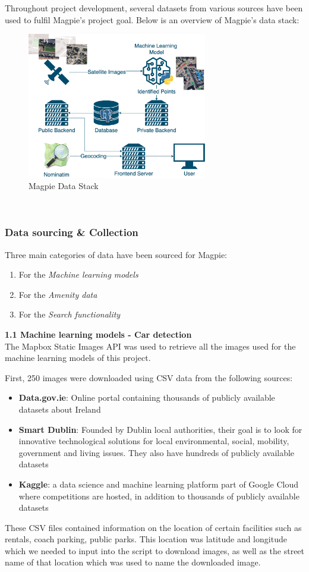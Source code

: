 Throughout project development, several datasets from various sources have been used to fulfil Magpie's project goal. Below is an overview of Magpie's data stack:
\begin{figure}[h!]
    \centering
    \includegraphics[width=0.7\textwidth]{images/magpie-data-stack.png}
    \caption{Magpie Data Stack}
\end{figure}\\

\subsubsection{Data sourcing \& Collection}
Three main categories of data have been sourced for Magpie:
\begin{enumerate}
    \item For the \emph{Machine learning models}
    \item For the \emph{Amenity data}
    \item For the \emph{Search functionality}
\end{enumerate}

\textbf{1.1 Machine learning models - Car detection}\\
The Mapbox Static Images API was used to retrieve all the images used for the machine learning models of this project.

First, 250 images were downloaded using CSV data from the following sources:
\begin{itemize}
    \item \textbf{Data.gov.ie}: Online portal containing thousands of publicly available datasets about Ireland
    \item \textbf{Smart Dublin}: Founded by Dublin local authorities, their goal is to look for innovative technological solutions for local environmental, social, mobility, government and living issues. They also have hundreds of publicly available datasets
    \item \textbf{Kaggle}: a data science and machine learning platform part of Google Cloud where competitions are hosted, in addition to thousands of publicly available datasets
\end{itemize}
These CSV files contained information on the location of certain facilities such as rentals, coach parking, public parks. This location was latitude and longitude which we needed to input into the script to download images, as well as the street name of that location which was used to name the downloaded image.\\

